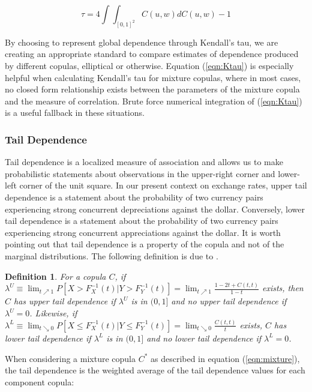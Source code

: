 \documentclass[12pt]{article}
\newtheorem{defn}{Definition}
\begin{document}
\begin{equation} \label{eqn:Ktau}
	\tau = 4\int\int_{\left[0,1\right]^{2}}C\left(u,w\right)dC\left(u,w\right) - 1 
\end{equation}

By choosing to represent global dependence through Kendall's tau, we are creating an appropriate standard to compare estimates of dependence produced by different copulas, elliptical or otherwise. Equation (\ref{eqn:Ktau}) is especially helpful when calculating Kendall's tau for mixture copulas, where in most cases, no closed form relationship exists between the parameters of the mixture copula and the measure of correlation. Brute force numerical integration of (\ref{eqn:Ktau}) is a useful fallback in these situations.

\subsubsection{Tail Dependence}

Tail dependence is a localized measure of association and allows us to make probabilistic statements about observations in the upper-right corner and lower-left corner of the unit square. In our present context on exchange rates, upper tail dependence is a statement about the probability of two currency pairs experiencing strong concurrent depreciations against the dollar. Conversely, lower tail dependence is a statement about the probability of two currency pairs experiencing strong concurrent appreciations against the dollar. It is worth pointing out that tail dependence is a property of the copula and not of the marginal distributions. The following definition is due to \cite{Joe_1997}.

\begin{defn} \label{defn:tail_dep}
	For a copula $C$, if $\lambda^{U}\equiv\lim_{t\nearrow 1}P\left[X > F_{X}^{-1}\left(t\right) | Y > F_{Y}^{-1}\left(t\right)\right] = \lim_{t\nearrow 1}\frac{1-2t+C\left(t,t\right)}{1-t}$ exists, then $C$ has upper tail dependence if $\lambda^{U}$ is in $(0,1]$ and no upper tail dependence if $\lambda^{U}=0$. Likewise, if $\lambda ^{L}\equiv \lim_{t\searrow 0}P\left[X\leq F_{X}^{-1}\left(t\right) | Y\leq F_{Y}^{-1}\left(t\right)\right] =\lim_{t\searrow 0}\frac{C\left(t,t\right)}{t}$ exists, $C$ has lower tail dependence if $\lambda ^{L}$ is in $(0,1]$ and no lower tail dependence if $\lambda^{L} = 0$.
\end{defn}

When considering a mixture copula $C^{\ast}$ as described in equation (\ref{eqn:mixture}), the tail dependence is the weighted average of the tail dependence values for each component copula:
\end{document}
